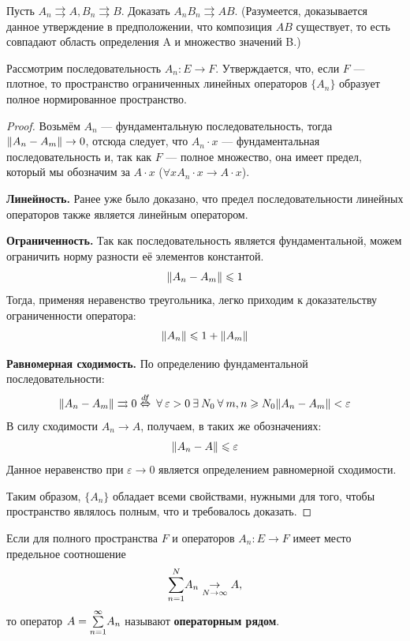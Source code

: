 	\exc Пусть $A_n \rightrightarrows A, B_n \rightrightarrows B$. Доказать $A_n B_n \rightrightarrows A B$. 
	(Разумеется, доказывается данное утверждение в предположении, что композиция $A B$ существует, то есть совпадают область определения
	A и множество значений B.)
	
	\begin{state}
		Рассмотрим последовательность $A_n : E \rightarrow F$. Утверждается, что, если $F$ --- плотное, то пространство 
		ограниченных линейных операторов $\{A_n\}$ образует полное нормированное пространство.
	\end{state}
	\begin{proof}
		Возьмём $A_n$ --- фундаментальную последовательность, тогда $\| A_n - A_m \| \rightarrow 0$, отсюда следует, что 
		$A_n \cdot x$ --- фундаментальная последовательность и, так как $F$ --- полное множество, она имеет предел, который
		мы обозначим за $A \cdot x$ ($\forall x A_n \cdot x \rightarrow A \cdot x$).
		
		\textbf{Линейность.} Ранее уже было доказано, что предел последовательности линейных операторов также является линейным
		оператором.
		
		\textbf{Ограниченность.} Так как последовательность является фундаментальной, можем ограничить норму разности её элементов 
		константой.
		$$\| A_n - A_m \| \leqslant 1$$
		Тогда, применяя неравенство треугольника, легко приходим к доказательству ограниченности оператора:
		$$\| A_n \| \leqslant 1 + \| A_m \|$$
		
		\textbf{Равномерная сходимость.} По определению фундаментальной последовательности:
		$$
			\norm{A_n - A_m} \rightrightarrows 0 \overset{df}{\equals} 
			\forall \varepsilon > 0 \exists N_0 \forall m, n \geq N_0 \norm{A_n - A_m} < \varepsilon
		$$
		В силу сходимости $A_n \rightarrow A$, получаем, в таких же обозначениях:
		$$ \| A_n - A \| \leqslant \varepsilon $$
		Данное неравенство при $\varepsilon \rightarrow 0$ является определением равномерной сходимости.
		
		Таким образом, $\{A_n\}$ обладает всеми свойствами, нужными для того, чтобы пространство являлось полным, что и требовалось 
		доказать.
	\end{proof}
	
	\begin{defi}
		Если для полного пространства $F$ и операторов $A_n : E \rightarrow F$ имеет место предельное соотношение
		$$\underset{n=1}{\overset{N}{\sum}} A_n \underset{N \rightarrow \infty}{\rightarrow} A,$$
		то оператор $A = \underset{n=1}{\overset{\infty}{\sum}} A_n$ называют \textbf{операторным рядом}.
	\end{defi}
	
